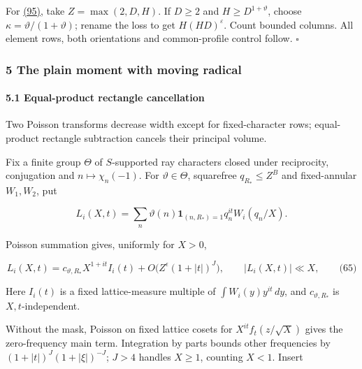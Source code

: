 For \protect\hyperlink{cf:eq:3.2}{(95)}, take \(Z=\max(2,D,H)\). If \(D\ge2\) and \(H\ge D^{1+\vartheta}\), choose \(\kappa=\vartheta/(1+\vartheta)\); rename the loss to get \(H(HD)^\varepsilon\). Count bounded columns. All element rows, both orientations and common-profile control follow. \(\square\)

\hypertarget{cf:sec:D}{}

\label{cf:sec:D}

\hypertarget{the-plain-moment-with-moving-radical}{%
\subsubsection{5 The plain moment with moving radical}\label{the-plain-moment-with-moving-radical}}

\hypertarget{cf:sec:D.1}{}

\label{cf:sec:D.1}

\hypertarget{equal-product-rectangle-cancellation}{%
\paragraph{5.1 Equal-product rectangle cancellation}\label{equal-product-rectangle-cancellation}}

Two Poisson transforms decrease width except for fixed-character rows; equal-product rectangle subtraction cancels their principal volume.

Fix a finite group \(\Theta\) of \(S\)-supported ray characters closed under reciprocity, conjugation and \(n\mapsto\chi_n(-1)\). For \(\vartheta\in\Theta\), squarefree \(q_{R_*}\le Z^B\) and fixed-annular \(W_1,W_2\), put

\[
L_i(X,t)=\sum_n\vartheta(n)\mathbf1_{(n,R_*)=1}q_n^{it}W_i(q_n/X).
\]

Poisson summation gives, uniformly for \(X>0\),

\hypertarget{cf:eq:D.1}{}

\label{cf:eq:D.1}

\[
L_i(X,t)=c_{\vartheta,R_*}X^{1+it}I_i(t)
 +O\bigl(Z^\epsilon(1+|t|)^J\bigr),\qquad |L_i(X,t)|\ll X,
\qquad\text{(65)}
\]

Here \(I_i(t)\) is a fixed lattice-measure multiple of \(\int W_i(y)y^{it}\,dy\), and \(c_{\vartheta,R_*}\) is \(X,t\)-independent.

Without the mask, Poisson on fixed lattice cosets for \(X^{it}f_t(z/\sqrt X)\) gives the zero-frequency main term. Integration by parts bounds other frequencies by \((1+|t|)^J(1+|\xi|)^{-J}\); \(J>4\) handles \(X\ge1\), counting \(X<1\). Insert

